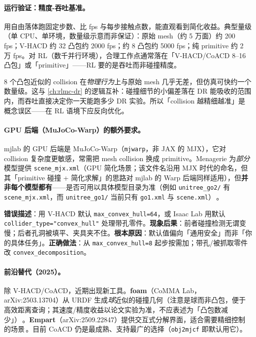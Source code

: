 \paragraph{运行验证：精度-吞吐基准。}用自由落体跑固定步数、比 fps 与每步接触点数，能直观看到简化收益。典型量级（单 CPU、单环境，数量级示意而非保证）：原始 mesh（约 5 万面）约 200 fps；V-HACD 约 32 凸包约 2000 fps；约 8 凸包约 5000 fps；纯 primitive 约 2 万 fps。对 RL（数千并行环境），合理工作点通常落在「V-HACD/CoACD 8--16 凸包」或「primitive」——RL 要的是吞吐而非碰撞精度。

\begin{insight}[对 RL，碰撞精度远不如吞吐重要]\label{ins:rlmc-assets-throughput}
8 个凸包近似的 collision 在\emph{物理行为}上与原始 mesh 几乎无差，但仿真可快约一个数量级。这与 \cref{ch:rlmc-dr} 的逻辑互补：碰撞细节的小偏差落在 DR 能吸收的范围内，而吞吐直接决定你一天能跑多少 DR 实验。所以「collision 越精细越准」是概念误区——在 RL 语境下应反向优化。
\end{insight}

\paragraph{GPU 后端（MuJoCo-Warp）的额外要求。}mjlab 的 GPU 后端是 MuJoCo-Warp（\texttt{mjwarp}，非 JAX 的 MJX），它对 collision 复杂度更敏感，常需把 mesh collision 换成 primitive。Menagerie 为\emph{部分}模型提供 \texttt{scene\_mjx.xml}（GPU 简化场景；该文件名沿用 MJX 时代的命名，但其「primitive 碰撞 + 简化求解」的思路对 mjlab 的 Warp 后端同样适用），但\textbf{并非每个模型都有}——是否可用以具体模型目录为准（例如 \texttt{unitree\_go2/} 有 \texttt{scene\_mjx.xml}，而 \texttt{unitree\_go1/} 当前只有 \texttt{go1.xml} 与 \texttt{scene.xml}）\,\cite{menagerie2022}。

\begin{pitfall}
\textbf{错误描述}：用 V-HACD 默认 \texttt{max\_convex\_hull=64}，或 Isaac Lab 用默认 \texttt{collider\_type="convex\_hull"} 处理带孔零件。\textbf{现象后果}：前者碰撞检测无谓变慢；后者孔洞被填平、夹具夹不住。\textbf{根本原因}：默认值偏向「通用安全」而非「你的具体任务」。\textbf{正确做法}：从 \texttt{max\_convex\_hull=8} 起步按需加；带孔/被抓取零件改 \texttt{convex\_decomposition}。
\end{pitfall}

\paragraph{前沿替代（2025）。}除 V-HACD/CoACD，近期出现新工具。\textbf{foam}（CoMMA Lab，arXiv:2503.13704）从 URDF 生成\emph{球}近似的碰撞几何（注意是球而非凸包，便于高效距离查询；其速度/精度收益以论文实验为准，不应表述为「凸包数减少」）\,\cite{foam2025}。\textbf{Empart}（arXiv:2509.22847）提供交互式分解界面，适合需要精细控制的场景\,\cite{empart2025}。目前 CoACD 仍是最成熟、支持最广的选择（\texttt{obj2mjcf} 即默认用它）。

